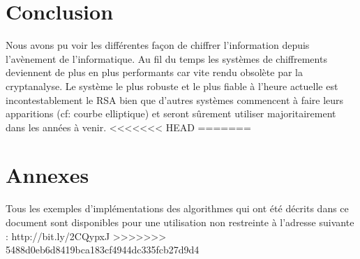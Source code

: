 \chapter*{Conclusion}
Nous avons pu voir les différentes façon de chiffrer l'information depuis l'avènement de l'informatique. Au fil du temps les systèmes de chiffrements deviennent de plus en plus performants car vite rendu obsolète par la cryptanalyse. Le système le plus robuste et le plus fiable à l'heure actuelle est incontestablement le RSA bien que d'autres systèmes commencent à faire leurs apparitions (cf: courbe elliptique) et seront sûrement utiliser majoritairement dans les années à venir.
<<<<<<< HEAD
=======
\chapter{Annexes}
Tous les exemples d'implémentations des algorithmes qui ont été décrits dans ce document sont disponibles pour une utilisation non restreinte à l'adresse suivante : http://bit.ly/2CQypxJ
>>>>>>> 5488d0eb6d8419bca183cf4944dc335fcb27d9d4
